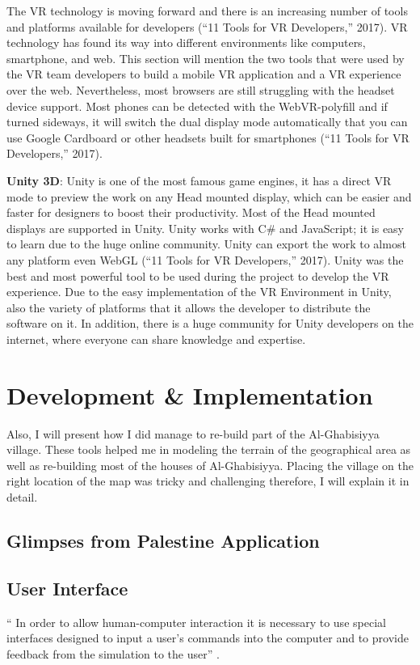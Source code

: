 The VR technology is moving forward and there is an increasing number of tools and platforms
available for developers (“11 Tools for VR Developers,” 2017). VR technology has found its
way into different environments like computers, smartphone, and web. This section will
mention the two tools that were used by the VR team developers to build a mobile VR
application and a VR experience over the web. Nevertheless, most browsers are still struggling
with the headset device support. Most phones can be detected with the WebVR-polyfill and
if turned sideways, it will switch the dual display mode automatically that you can use Google
Cardboard or other headsets built for smartphones (“11 Tools for VR Developers,” 2017).


\textbf{Unity 3D}: Unity is one of the most famous game engines, it has a direct VR mode to preview
the work on any Head mounted display, which can be easier and faster for designers to boost
their productivity. Most of the Head mounted displays are supported in Unity. Unity works
with C\# and JavaScript; it is easy to learn due to the huge online community. Unity can export
the work to almost any platform even WebGL (“11 Tools for VR Developers,” 2017). Unity was
the best and most powerful tool to be used during the project to develop the VR experience.
Due to the easy implementation of the VR Environment in Unity, also the variety of platforms
that it allows the developer to distribute the software on it. In addition, there is a huge
community for Unity developers on the internet, where everyone can share knowledge and
expertise.

\section{Development \& Implementation}

 Also, I will present how I did manage to re-build part of the Al-Ghabisiyya village. These tools helped me in modeling the terrain of the geographical area as well as re-building most of the houses of Al-Ghabisiyya. Placing the village on the right location of the map was tricky and challenging therefore, I will explain it in detail. 

\subsection{Glimpses from Palestine Application}





\subsection{User Interface}

“ In order to allow human-computer interaction it is necessary to use special interfaces designed to input a user's commands into the computer and to provide feedback from the simulation to the user” \citep{burdea2017virtual}.